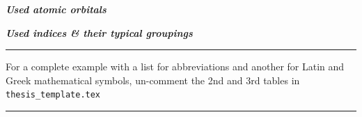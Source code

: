 \vspace*{1em}
\textit{\textbf{Used atomic orbitals}}\par


\vspace*{1em}
\textit{\textbf{Used indices \& their typical groupings}}\par

\sym{ \hspace*{2em} $\cdot$ }{ $\alpha$, $\beta$, $\gamma$ }
\sym{ \hspace*{2em} $\cdot$ }{ $\sigma$, $\sigma^{\prime}$ }
\sym{ \hspace*{2em} $\cdot$ }{ $\mu$, $\nu$ }

\vspace*{1em}
\noindent\rule{\linewidth}{0.6pt}

\vspace*{1em}
\noindent For a complete example with a list for abbreviations and another for Latin and Greek mathematical symbols, un-comment the 2nd and 3rd tables in \texttt{thesis\_template.tex}\par

\vspace*{1em}
\noindent\rule{\linewidth}{0.6pt}
